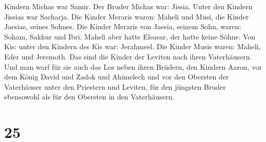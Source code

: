 Kindern Michas war Samir.  Der Bruder Michas war: Jissia.
Unter den Kindern Jissias war Sacharja.  Die Kinder
Meraris waren: Maheli und Musi, die Kinder Jaesias, seines Sohnes.
 Die Kinder Meraris von Jaesia, seinem Sohn, waren:
Soham, Sakkur und Ibri.  Maheli aber hatte Eleasar, der
hatte keine Söhne.  Von Kis: unter den Kindern des Kis
war: Jerahmeel.  Die Kinder Musis waren: Maheli, Eder und
Jeremoth. Das sind die Kinder der Leviten nach ihren Vaterhäusern.
 Und man warf für sie auch das Los neben ihren Brüdern,
den Kindern Aaron, vor dem König David und Zadok und Ahimelech und vor
den Obersten der Vaterhäuser unter den Priestern und Leviten, für den
jüngsten Bruder ebensowohl als für den Obersten in den Vaterhäusern.

\hypertarget{section-24}{%
\section{25}\label{section-24}}


